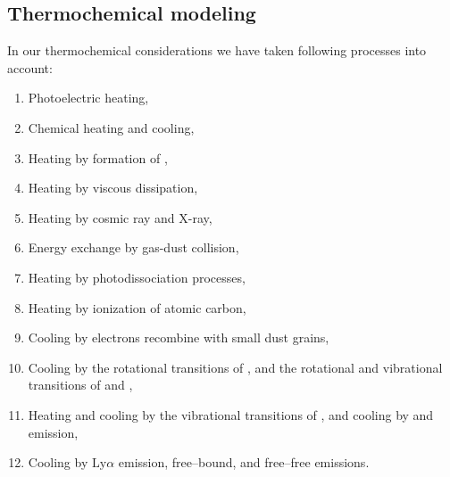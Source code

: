 \subsection{Thermochemical modeling}
In our thermochemical considerations we have taken following processes into account:
\begin{enumerate}
	\item Photoelectric heating,
	\item Chemical heating and cooling,
	\item Heating by formation of ,
	\item Heating by viscous dissipation,
	\item Heating by cosmic ray and X-ray,
	\item Energy exchange by gas-dust collision,
	\item Heating by photodissociation processes,
	\item Heating by ionization of atomic carbon,
	\item Cooling by electrons recombine with small dust grains,
	\item Cooling by the rotational transitions of , and the rotational and vibrational transitions of  and ,
	\item Heating and cooling by the vibrational transitions of , and cooling by  and  emission,
	\item Cooling by $\text{Ly}\alpha$ emission, free–bound, and free–free emissions.
\end{enumerate}
